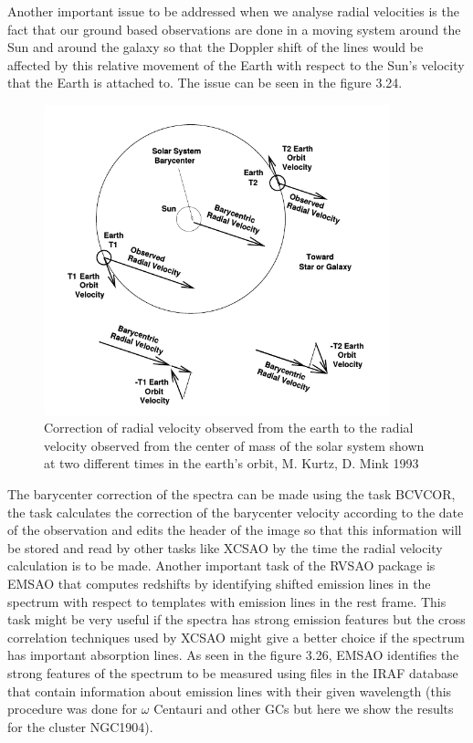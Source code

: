Another important issue to be addressed when we analyse radial velocities is the fact that our ground based observations are done in a moving system around the Sun and around the galaxy so that the Doppler shift of the lines would be affected by this relative movement of the Earth with respect to the Sun's velocity that the Earth is attached to. The issue can be seen in the figure 3.24.

\begin{figure}[H]
\centering
\includegraphics[width=10cm]{images/bcvcor.png}
\caption[The nature of the barycenter shift of radial velocities]{Correction of radial velocity observed from the earth to the radial velocity observed from the center of mass of the solar system shown at two different times in the earth's orbit, M. Kurtz, D. Mink 1993 \cite{1}}
\end{figure}

The barycenter correction of the spectra can be made using the task BCVCOR, the task calculates the correction of the barycenter velocity according to the date of the observation and edits the header of the image so that this information will be stored and read by other tasks like XCSAO by the time the radial velocity calculation is to be made. Another important task of the RVSAO package is EMSAO that computes redshifts by identifying shifted emission lines in the spectrum with respect to templates with emission lines in the rest frame. This task might be very useful if the spectra has strong emission features but the cross correlation techniques used by XCSAO might give a better choice if the spectrum has important absorption lines.
As seen in the figure 3.26, EMSAO identifies the strong features of the spectrum to be measured using files in the IRAF database that contain information about emission lines with their given wavelength (this procedure was done for $\omega$ Centauri and other GCs but here we show the results for the cluster NGC1904).  

